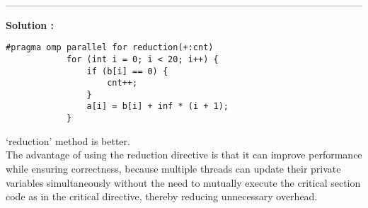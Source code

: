 \documentclass[addpoints, 12pt]{exam}
\begin{document}
\begin{questions}
\begin{parts}
    \_\_\_\_\_\_\_\_\_\_\_\_\_\_\_\_\_\_\_\_\_\_\_\_\_\_\_\_\_\_\_\_\_\_\_\_\_\_\_\_\_\_\_\_\_\_\_\_\\

    \begin{framed}
        \textbf{Solution :}
        \begin{lstlisting}[style = S]
            #pragma omp parallel for reduction(+:cnt)
            for (int i = 0; i < 20; i++) {
                if (b[i] == 0) {
                    cnt++;
                }
                a[i] = b[i] + inf * (i + 1);
            }
        \end{lstlisting}

        `reduction' method is better.\\
        The advantage of using the reduction directive is that it can improve performance while ensuring correctness, 
        because multiple threads can update their private variables simultaneously without the need to mutually execute the critical section code as in the critical directive, 
        thereby reducing unnecessary overhead.
    \end{framed}

\end{parts}

\end{questions}
\end{document}
